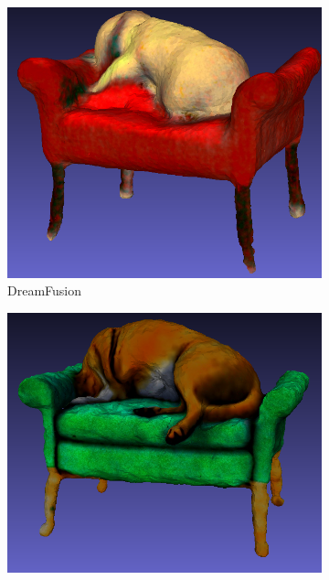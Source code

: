 \begin{figure}[ht]
    \centering
    \small
    \begin{subfigure}[b]{0.291\textwidth}
        \centering
        \includegraphics[width=\textwidth]{figures/subjective/dreamfusion_dog_back_result.png}
        \caption{DreamFusion}
        \vspace{0.1cm}
    \end{subfigure}
    \begin{subfigure}[b]{0.3\textwidth}
        \centering
        \includegraphics[width=\textwidth]{figures/subjective/magic3D_dog_back_result.png}

\end{subfigure}
\end{figure}
